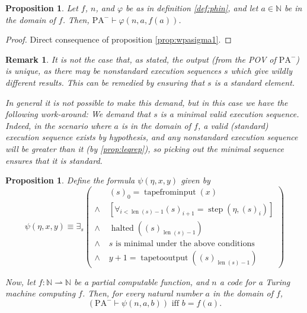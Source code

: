 \documentclass{article}
\newtheorem{prop}[theorem]{Proposition}
\newtheorem{remark}[theorem]{Remark}
\theoremstyle{nonumberplain}
\newtheorem{proof}{Proof}
\newcommand{\N}{\mathbb{N}}
\newcommand{\PA}{\mathrm{PA}}
\newcommand{\WPA}{\PA^-}
\DeclareMathOperator{\step}{step}
\DeclareMathOperator{\tapefrominput}{tapefrominput}
\DeclareMathOperator{\tapetooutput}{tapetooutput}
\DeclareMathOperator{\halted}{halted}
\DeclareMathOperator{\len}{len}
\begin{document}
\begin{prop}
Let $f$, $n$, and $\varphi$ be as in definition \ref{def:phin}, and let $a \in \N$ be in the domain of $f$. Then, $\WPA \vdash \varphi(n,a,f(a))$.
\end{prop}

\begin{proof}
Direct consequence of proposition \ref{prop:wpasigma1}.
\end{proof}

\begin{remark}
It is not the case that, as stated, the output (from the POV of $\WPA$) is unique, as there may be nonstandard execution sequences $s$ which give wildly different results. This can be remedied by ensuring that $s$ is a standard element.

In general it is not possible to make this demand, but in this case we have the following work-around: We demand that $s$ is a minimal valid execution sequence. Indeed, in the scenario where $a$ is in the domain of $f$, a valid (standard) execution sequence exists by hypothesis, and any nonstandard execution sequence will be greater than it (by \ref{prop:leqrep}), so picking out the minimal sequence ensures that it is standard.
\end{remark}

\begin{prop}
Define the formula $\psi(\eta,x,y)$ given by
\begin{equation}
\psi(\eta,x,y) \equiv \exists_s \left(
\begin{aligned}
&(s)_0 = \tapefrominput(x)\\
\land \; &[\forall_{i < \len(s) - 1} (s)_{i+1} = \step(\eta, (s)_i)]\\
\land \; &\halted((s)_{\len(s)-1})\\
\land \; &\text{$s$ is minimal under the above conditions}\\
\land \; &y+1 = \tapetooutput((s)_{\len(s) - 1})
\end{aligned} \right)
\end{equation}

Now, let $f \colon \N \rightharpoonup \N$ be a partial computable function, and $n$ a code for a Turing machine computing $f$. Then, for every natural number $a$ in the domain of $f$,
\begin{equation}
\left( \WPA \vdash \psi(n,a,b) \right) \text{ iff } b = f(a).
\end{equation}
\end{prop}
\end{document}
